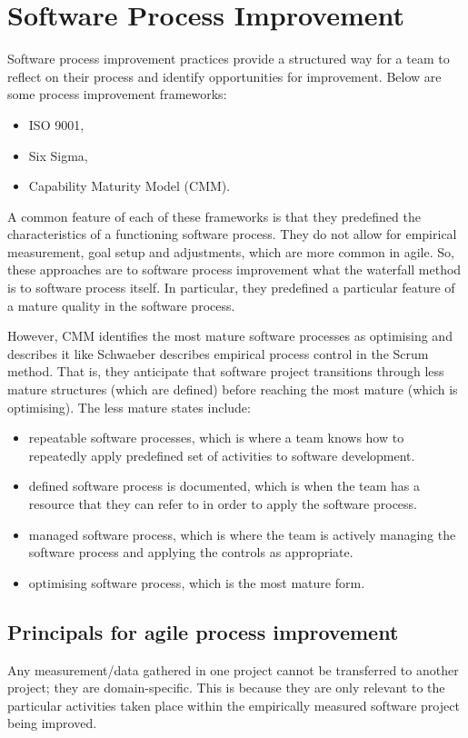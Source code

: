 \documentclass[a4paper, openany]{memoir}
\begin{document}
\chapter{Software Process Improvement}
Software process improvement practices provide a structured way for a team to reflect on their process and identify opportunities for improvement. Below are some process improvement frameworks:
\begin{itemize}
    \item ISO 9001,
    \item Six Sigma,
    \item Capability Maturity Model (CMM).
\end{itemize}
A common feature of each of these frameworks is that they predefined the characteristics of a functioning software process. They do not allow for empirical measurement, goal setup and adjustments, which are more common in agile. So, these approaches are to software process improvement what the waterfall method is to software process itself. In particular, they predefined a particular feature of a mature quality in the software process.

However, CMM identifies the most mature software processes as optimising and describes it like Schwaeber describes empirical process control in the Scrum method. That is, they anticipate that software project transitions through less mature structures (which are defined) before reaching the most mature (which is optimising). The less mature states include:
\begin{itemize}
    \item repeatable software processes, which is where a team knows how to repeatedly apply predefined set of activities to software development.
    \item defined software process is documented, which is when the team has a resource that they can refer to in order to apply the software process.
    \item managed software process, which is where the team is actively managing the software process and applying the controls as appropriate.
    \item optimising software process, which is the most mature form.
\end{itemize}

\section{Principals for agile process improvement}
Any measurement/data gathered in one project cannot be transferred to another project; they are domain-specific. This is because they are only relevant to the particular activities taken place within the empirically measured software project being improved.
\end{document}
